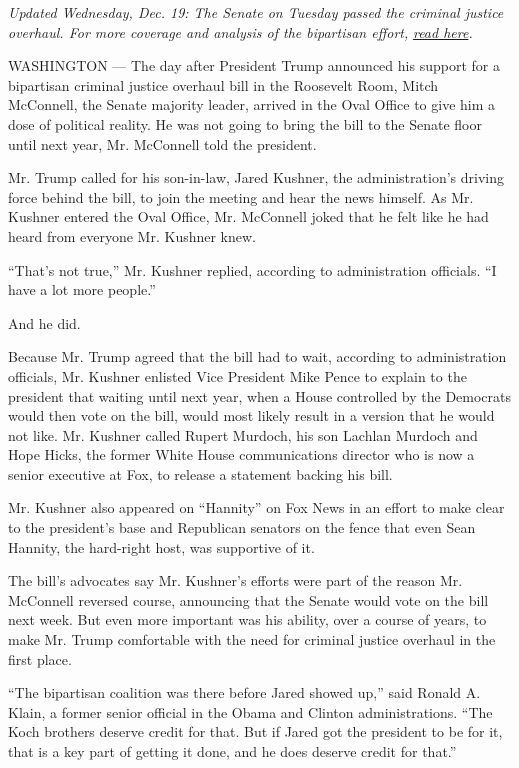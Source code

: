 \emph{Updated Wednesday, Dec. 19: The Senate on Tuesday passed the
criminal justice overhaul. For more coverage and analysis of the
bipartisan effort,}
\href{https://www.nytimes.com/2018/12/18/us/politics/senate-criminal-justice-bill.html}{\emph{read
here}}\emph{.}

WASHINGTON --- The day after President Trump announced his support for a
bipartisan criminal justice overhaul bill in the Roosevelt Room, Mitch
McConnell, the Senate majority leader, arrived in the Oval Office to
give him a dose of political reality. He was not going to bring the bill
to the Senate floor until next year, Mr. McConnell told the president.

Mr. Trump called for his son-in-law, Jared Kushner, the administration's
driving force behind the bill, to join the meeting and hear the news
himself. As Mr. Kushner entered the Oval Office, Mr. McConnell joked
that he felt like he had heard from everyone Mr. Kushner knew.

``That's not true,'' Mr. Kushner replied, according to administration
officials. ``I have a lot more people.''

And he did.

Because Mr. Trump agreed that the bill had to wait, according to
administration officials, Mr. Kushner enlisted Vice President Mike Pence
to explain to the president that waiting until next year, when a House
controlled by the Democrats would then vote on the bill, would most
likely result in a version that he would not like. Mr. Kushner called
Rupert Murdoch, his son Lachlan Murdoch and Hope Hicks, the former White
House communications director who is now a senior executive at Fox, to
release a statement backing his bill.

Mr. Kushner also appeared on ``Hannity'' on Fox News in an effort to
make clear to the president's base and Republican senators on the fence
that even Sean Hannity, the hard-right host, was supportive of it.

The bill's advocates say Mr. Kushner's efforts were part of the reason
Mr. McConnell reversed course, announcing that the Senate would vote on
the bill next week. But even more important was his ability, over a
course of years, to make Mr. Trump comfortable with the need for
criminal justice overhaul in the first place.

``The bipartisan coalition was there before Jared showed up,'' said
Ronald A. Klain, a former senior official in the Obama and Clinton
administrations. ``The Koch brothers deserve credit for that. But if
Jared got the president to be for it, that is a key part of getting it
done, and he does deserve credit for that.''

